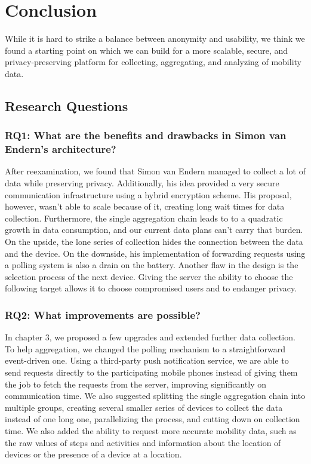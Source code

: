 
\chapter{Conclusion}\label{chapter:conclusion}
While it is hard to strike a balance between anonymity and usability, we think we found a starting point on which we can build for a more scalable, secure, and privacy-preserving platform for collecting, aggregating, and analyzing of mobility data.

\section{Research Questions}
\subsection*{RQ1: What are the benefits and drawbacks in Simon van Endern's architecture?}
After reexamination, we found that Simon van Endern managed to collect a lot of data while preserving privacy. Additionally, his idea provided a very secure communication infrastructure using a hybrid encryption scheme. His proposal, however, wasn't able to scale because of it, creating long wait times for data collection.
Furthermore, the single aggregation chain leads to to a quadratic growth in data consumption, and our current data plans can't carry that burden. On the upside, the lone series of collection hides the connection between the data and the device. On the downside, his implementation of forwarding requests using a polling system is also a drain on the battery.
Another flaw in the design is the selection process of the next device. Giving the server the ability to choose the following target allows it to choose compromised users and to endanger privacy. 

\subsection*{RQ2: What improvements are possible?}
In chapter 3, we proposed a few upgrades and extended further data collection. To help aggregation, we changed the polling mechanism to a straightforward event-driven one. Using a third-party push notification service, we are able to send requests directly to the participating mobile phones instead of giving them the job to fetch the requests from the server, improving significantly on communication time. We also suggested splitting the single aggregation chain into multiple groups, creating several smaller series of devices to collect the data instead of one long one, parallelizing the process, and cutting down on collection time. We also added the ability to request more accurate mobility data, such as the raw values of steps and activities and information about the location of devices or the presence of a device at a location. 

